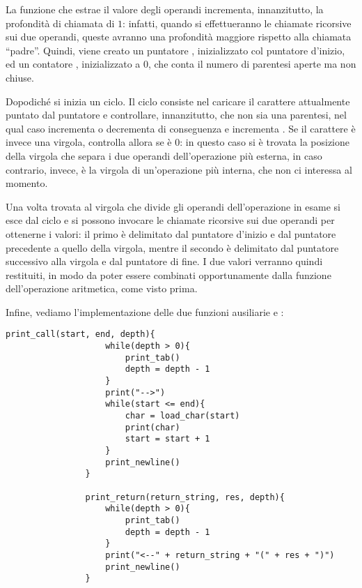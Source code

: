         La funzione che estrae il valore degli operandi incrementa, innanzitutto, la profondità di chiamata di $1$: infatti, quando si effettueranno le chiamate ricorsive sui due operandi, queste avranno una profondità maggiore rispetto alla chiamata ``padre''. Quindi, viene creato un puntatore , inizializzato col puntatore d'inizio, ed un contatore , inizializzato a $0$, che conta il numero di parentesi aperte ma non chiuse.
        
        Dopodiché si inizia un ciclo. Il ciclo consiste nel caricare il carattere attualmente puntato dal puntatore  e controllare, innanzitutto, che non sia una parentesi, nel qual caso incrementa o decrementa  di conseguenza e incrementa . Se il carattere è invece una virgola, controlla allora se  è $0$: in questo caso si è trovata la posizione della virgola che separa i due operandi dell'operazione più esterna, in caso contrario, invece, è la virgola di un'operazione più interna, che non ci interessa al momento.
        
        Una volta trovata al virgola che divide gli operandi dell'operazione in esame si esce dal ciclo e si possono invocare le chiamate ricorsive sui due operandi per ottenerne i valori: il primo è delimitato dal puntatore d'inizio e dal puntatore precedente a quello della virgola, mentre il secondo è delimitato dal puntatore successivo alla virgola e dal puntatore di fine. I due valori verranno quindi restituiti, in modo da poter essere combinati opportunamente dalla funzione dell'operazione aritmetica, come visto prima.
        
        Infine, vediamo l'implementazione delle due funzioni ausiliarie  e :
		
        \begin{center}
           	\begin{lstlisting}[language=pseudo, gobble=14]
                print_call(start, end, depth){
                    while(depth > 0){
                        print_tab()
                        depth = depth - 1
                    }
                    print("-->")
                    while(start <= end){
                        char = load_char(start)
                        print(char)
                        start = start + 1
                    }
                    print_newline()
                }
                
                print_return(return_string, res, depth){
                    while(depth > 0){
                        print_tab()
                        depth = depth - 1
                    }
                    print("<--" + return_string + "(" + res + ")")
                    print_newline()
                }
           	\end{lstlisting}
        \end{center}
		
